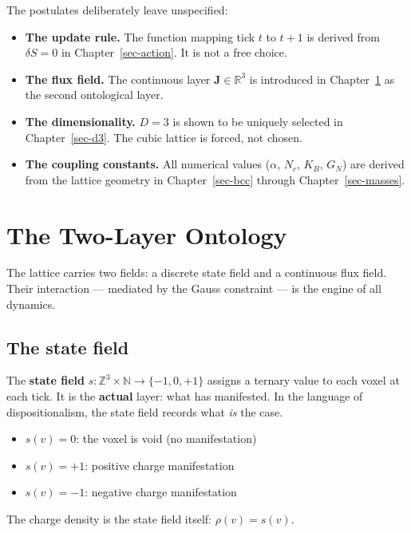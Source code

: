 \documentclass[
  11pt,
  letterpaper,
  twoside,
  openany]{book}
\makeatletter
\providecommand{\tightlist}{%
  \setlength{\itemsep}{0pt}\setlength{\parskip}{0pt}}
\let\orig@section\section
\renewcommand{\section}{\needspace{8\baselineskip}\orig@section}
\makeatother
\begin{document}
The postulates deliberately leave unspecified:

\begin{itemize}
\tightlist
\item
  \textbf{The update rule.} The function mapping tick \(t\) to \(t+1\)
  is derived from \(\delta S = 0\) in Chapter~\ref{sec-action}. It is
  not a free choice.
\item
  \textbf{The flux field.} The continuous layer
  \(\mathbf{J} \in \mathbb{R}^3\) is introduced in
  Chapter~\ref{sec-ontology} as the second ontological layer.
\item
  \textbf{The dimensionality.} \(D = 3\) is shown to be uniquely
  selected in Chapter~\ref{sec-d3}. The cubic lattice is forced, not
  chosen.
\item
  \textbf{The coupling constants.} All numerical values (\(\alpha\),
  \(N_c\), \(K_B\), \(G_N\)) are derived from the lattice geometry in
  Chapter~\ref{sec-bcc} through Chapter~\ref{sec-masses}.
\end{itemize}

\chapter{The Two-Layer Ontology}\label{sec-ontology}

The lattice carries two fields: a discrete state field and a continuous
flux field. Their interaction --- mediated by the Gauss constraint ---
is the engine of all dynamics.

\section{The state field}\label{the-state-field}

The \textbf{state field}
\(s : \mathbb{Z}^3 \times \mathbb{N} \to \{-1, 0, +1\}\) assigns a
ternary value to each voxel at each tick. It is the \textbf{actual}
layer: what has manifested. In the language of dispositionalism, the
state field records what \emph{is} the case.

\begin{itemize}
\tightlist
\item
  \(s(v) = 0\): the voxel is void (no manifestation)
\item
  \(s(v) = +1\): positive charge manifestation
\item
  \(s(v) = -1\): negative charge manifestation
\end{itemize}

The charge density is the state field itself: \(\rho(v) = s(v)\).
\end{document}
